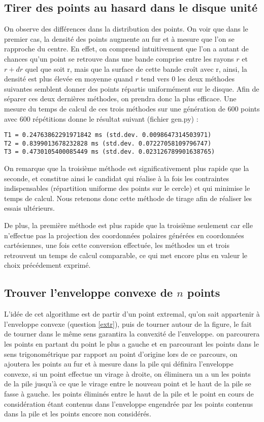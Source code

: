 \documentclass[a4paper,12pt,twoside]{article}
\begin{document}
	\subsection{Tirer des points au hasard dans le disque unité}
		On observe des différences dans la distribution des points. On voir que dans le premier cas, la densité des points augmente au fur et à mesure que l'on se rapproche du centre. En effet, on comprend intuitivement que l'on a autant de chances qu'un point se retrouve dans une bande comprise entre les rayons $r$ et $r + dr$ quel que soit r, mais que la surface de cette bande croît avec r, ainsi, la densité est plus élevée en moyenne quand $r$ tend vers $0$ les deux méthodes suivantes semblent donner des points répartis uniformément sur le disque.
		Afin de séparer ces deux dernières méthodes, on prendra donc la plus efficace. Une mesure du temps de calcul de ces trois méthodes sur une génération de 600 points avec 600 répétitions donne le résultat suivant (fichier gen.py) : 
		\begin{verbatim}T1 = 0.24763862291971842 ms (std.dev. 0.0098647314503971)
T2 = 0.8399013678232828 ms (std.dev. 0.07227058109796747)
T3 = 0.4730105400085449 ms (std.dev. 0.023126789901638765)
\end{verbatim}
		On remarque que la troisième méthode est significativement plus rapide que la seconde, et constitue ainsi le candidat qui réalise à la fois les contraintes indispensables (répartition uniforme des points sur le cercle) et qui minimise le temps de calcul. Nous retenons donc cette méthode de tirage afin de réaliser les essais ultérieurs.

		De plus, la première méthode est plus rapide que la troisième seulement car elle n'effectue pas la projection des coordonnées polaires générées en coordonnées cartésiennes, une fois cette conversion effectuée, les méthodes un et trois retrouvent un temps de calcul comparable, ce qui met encore plus en valeur le choix précédement exprimé.

	\subsection{Trouver l'enveloppe convexe de $n$ points}

		L'idée de cet algorithme est de partir d'un point extremal, qu'on sait appartenir à l'enveloppe convexe (question \ref{extr}), puis de tourner autour de la figure, le fait de tourner dans le même sens garantira la convexité de l'enveloppe. on parcourera les points en partant du point le plus a gauche et en parcourant les points dans le sens trigonométrique par rapport au point d'origine lors de ce parcours, on ajoutera les points au fur et à mesure dans la pile qui définira l'enveloppe convexe, si un point effectue un virage à droite, on éliminera un a un les points de la pile jusqu'à ce que le virage entre le nouveau point et le haut de la pile se fasse à gauche. les points éliminés entre le haut de la pile et le point en cours de considération étant contenus dans l'enveloppe engendrée par les points contenus dans la pile et les points encore non considérés.  
\end{document}
